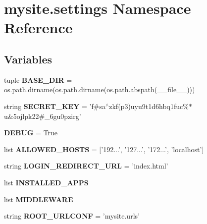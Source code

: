 \hypertarget{namespacemysite_1_1settings}{\section{mysite.\-settings Namespace Reference}
\label{namespacemysite_1_1settings}
}
\subsection*{Variables}
\begin{DoxyCompactItemize}
\item 
\hypertarget{namespacemysite_1_1settings_addb5cd2f2982b7eb7113b40cdfdf0e7d}{tuple {\bfseries B\-A\-S\-E\-\_\-\-D\-I\-R} = os.\-path.\-dirname(os.\-path.\-dirname(os.\-path.\-abspath(\-\_\-\-\_\-file\-\_\-\-\_\-)))}\label{namespacemysite_1_1settings_addb5cd2f2982b7eb7113b40cdfdf0e7d}

\item 
\hypertarget{namespacemysite_1_1settings_ab2aed82d2734b39d5387b22b7a953de5}{string {\bfseries S\-E\-C\-R\-E\-T\-\_\-\-K\-E\-Y} = 'f\#sa$^\wedge$zkf(p3)uyu9t1d6hbq1fuc\%$\ast$u\&5ojlpk22\#\-\_\-6gu0pzirg'}\label{namespacemysite_1_1settings_ab2aed82d2734b39d5387b22b7a953de5}

\item 
\hypertarget{namespacemysite_1_1settings_ae7ae0ac83176d533cc1c1d84862c82bf}{{\bfseries D\-E\-B\-U\-G} = True}\label{namespacemysite_1_1settings_ae7ae0ac83176d533cc1c1d84862c82bf}

\item 
\hypertarget{namespacemysite_1_1settings_ab6f4415a608815b8ca5f84d320437cf8}{list {\bfseries A\-L\-L\-O\-W\-E\-D\-\_\-\-H\-O\-S\-T\-S} = \mbox{[}'192...', '127...', '172...', 'localhost'\mbox{]}}\label{namespacemysite_1_1settings_ab6f4415a608815b8ca5f84d320437cf8}

\item 
\hypertarget{namespacemysite_1_1settings_a626f4fd3c8256437791205c2ce7b0cdd}{string {\bfseries L\-O\-G\-I\-N\-\_\-\-R\-E\-D\-I\-R\-E\-C\-T\-\_\-\-U\-R\-L} = 'index.\-html'}\label{namespacemysite_1_1settings_a626f4fd3c8256437791205c2ce7b0cdd}

\item 
list {\bfseries I\-N\-S\-T\-A\-L\-L\-E\-D\-\_\-\-A\-P\-P\-S}
\item 
list {\bfseries M\-I\-D\-D\-L\-E\-W\-A\-R\-E}
\item 
\hypertarget{namespacemysite_1_1settings_ab0a7fa8cdaaccbf5bf874db67cbe507a}{string {\bfseries R\-O\-O\-T\-\_\-\-U\-R\-L\-C\-O\-N\-F} = 'mysite.\-urls'}\label{namespacemysite_1_1settings_ab0a7fa8cdaaccbf5bf874db67cbe507a}


\end{DoxyCompactItemize}
